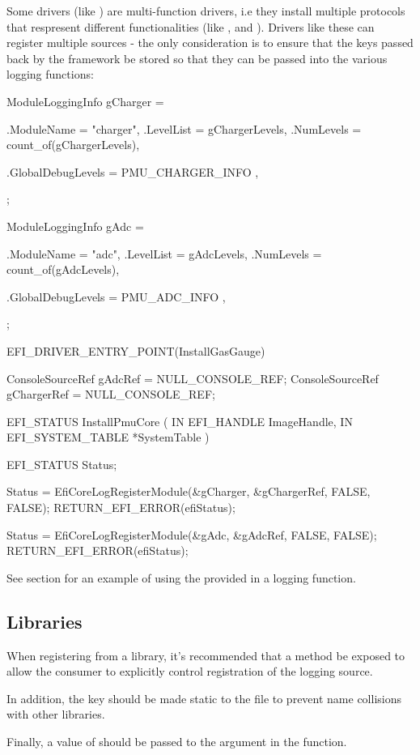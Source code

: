 Some drivers (like ) are multi-function drivers, i.e they install multiple protocols that respresent different 
functionalities (like ,  and ). Drivers like these can register multiple 
sources - the only consideration is to ensure that the  keys passed back by the framework be stored so that they 
can be passed into the various logging functions:

\begin{SampleCode}
ModuleLoggingInfo gCharger = {
    .ModuleName = "charger",
    .LevelList = gChargerLevels,
    .NumLevels = count_of(gChargerLevels),

    .GlobalDebugLevels = {
        PMU_CHARGER_INFO
    },
};

ModuleLoggingInfo gAdc = {
    .ModuleName = "adc",
    .LevelList = gAdcLevels,
    .NumLevels = count_of(gAdcLevels),

    .GlobalDebugLevels = {
        PMU_ADC_INFO
    },
};

EFI_DRIVER_ENTRY_POINT(InstallGasGauge)

ConsoleSourceRef gAdcRef = NULL_CONSOLE_REF;
ConsoleSourceRef gChargerRef = NULL_CONSOLE_REF;

EFI_STATUS
InstallPmuCore (
		IN EFI_HANDLE		ImageHandle,
		IN EFI_SYSTEM_TABLE	*SystemTable
		)
{
	EFI_STATUS Status;

    Status = EfiCoreLogRegisterModule(&gCharger, &gChargerRef, FALSE, FALSE);
    RETURN_EFI_ERROR(efiStatus);

    Status = EfiCoreLogRegisterModule(&gAdc, &gAdcRef, FALSE, FALSE);
    RETURN_EFI_ERROR(efiStatus);
}
\end{SampleCode}

See section  for an example of using the provided  in a logging function. 

\subsection{Libraries}

When registering from a library, it's recommended that a method be exposed to allow the consumer to explicitly control registration of the logging source.

In addition, the  key should be made static to the file to prevent name collisions with other libraries. 

Finally, a value of  should be passed to the  argument in the  function.

